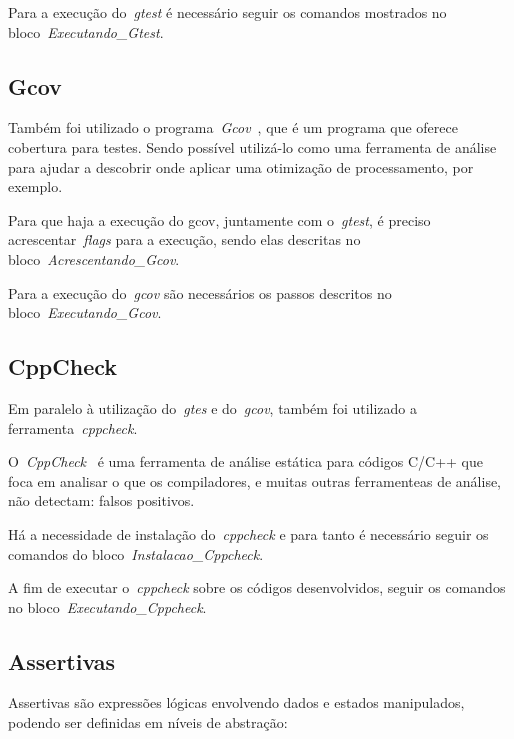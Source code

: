 \documentclass[conference]{Trabalho_1}
\begin{document}


Para a execu\c{c}\~ao do~\textit{gtest} \'e necess\'ario seguir os comandos mostrados no bloco~\textit{Executando\_Gtest}.




\subsection{Gcov}
Tamb\'em foi utilizado o programa~\textit{Gcov}~\cite{gcov}, que \'e um programa que oferece cobertura para testes. Sendo poss\'ivel utiliz\'a-lo como uma ferramenta de an\'alise para ajudar a descobrir onde aplicar uma otimiza\c{c}\~ao de processamento, por exemplo.

Para que haja a execu\c{c}\~ao do gcov, juntamente com o~\textit{gtest}, \'e preciso acrescentar~\textit{flags} para a execu\c{c}\~ao, sendo elas descritas no bloco~\textit{Acrescentando\_Gcov}.



Para a execu\c{c}\~ao do~\textit{gcov} s\~ao necess\'arios os passos descritos no bloco~\textit{Executando\_Gcov}.




\subsection{CppCheck}
Em paralelo \`a utiliza\c{c}\~ao do~\textit{gtes} e do~\textit{gcov}, tamb\'em foi utilizado a ferramenta~\textit{cppcheck}.

O~\textit{CppCheck}~\cite{cppcheck} \'e uma ferramenta de an\'alise est\'atica para c\'odigos C/C++ que foca em analisar o que os compiladores, e muitas outras ferramenteas de an\'alise, n\~ao detectam: falsos positivos.

H\'a a necessidade de instala\c{c}\~ao do~\textit{cppcheck} e para tanto \'e necess\'ario seguir os comandos do bloco~\textit{Instalacao\_Cppcheck}.



A fim de executar o~\textit{cppcheck} sobre os c\'odigos desenvolvidos, seguir os comandos no bloco~\textit{Executando\_Cppcheck}.



\subsection{Assertivas}
Assertivas s\~ao express\~oes l\'ogicas envolvendo dados e estados manipulados, podendo ser definidas em n\'iveis de abstra\c{c}\~ao:
\end{document}
